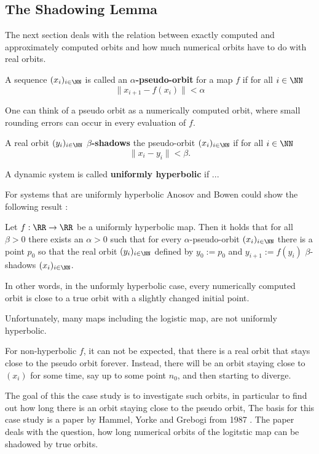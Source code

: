   \subsection{The Shadowing Lemma}
    The next section deals with the relation between exactly computed and approximately computed orbits and how much numerical orbits have to do with real orbits. 
    \begin{definition}\label{def:pseudoorbit}
      A sequence $(x_i)_{i \in \NN}$ is called an \textbf{$\alpha$-pseudo-orbit} for a map $f$ if for all $i \in \NN$
      $$ \| x_{i+1} - f(x_i) \| < \alpha $$  
    \end{definition}
    One can think of a pseudo orbit as a numerically computed orbit, where small rounding errors can occur in every evaluation of $f$.
    \begin{definition}\label{def:shadowing}
      A real orbit $(y_i)_{i \in \NN}$ \textbf{$\beta$-shadows} the pseudo-orbit $(x_i)_{i \in \NN}$ if for all $i \in \NN$
      $$\| x_i - y_i \| < \beta.$$  
    \end{definition}
    \begin{definition}
      A dynamic system is called \textbf{uniformly hyperbolic} if ...
    \end{definition}
    For systems that are uniformly hyperbolic Anosov and Bowen could show the following result \cite{anosov1967} \cite{Bowen1975} \cite{Hasselblatt:2008}:
    \begin{theorem}
     Let $f: \RR \to \RR$ be a uniformly hyperbolic map.
     Then it holds that for all $\beta > 0$ there exists an $\alpha > 0$ such that for every $\alpha$-pseudo-orbit $(x_i)_{i \in \NN}$
     there is a point $p_0$ so that the real orbit $(y_i)_{i \in \NN}$ defined by $y_0 := p_0$ and $y_{i+1} := f(y_i)$ $\beta$-shadows $(x_i)_{i \in \NN}$.
    \end{theorem} 
    In other words, in the unformly hyperbolic case, every numerically computed orbit is close to a true orbit with a slightly changed initial point.

    Unfortunately, many maps including the logistic map, are not uniformly hyperbolic. 

    For non-hyperbolic $f$, it can not be expected, that there is a real orbit that stays close to the pseudo orbit forever.
    Instead, there will be an orbit staying close to $(x_i)$ for some time, say up to some point $n_0$, and then starting to diverge. 

    The goal of this the case study is to investigate such orbits, in particular to find out how long there is an orbit staying close to the pseudo orbit,
    The basis for this case study is a paper by Hammel, Yorke and Grebogi from 1987 \cite{Hammel1987}.
    The paper deals with the question, how long numerical orbits of the logitstic map can be shadowed by true orbits.

